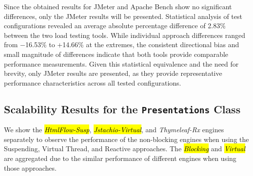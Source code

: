 \documentclass[software,article,accept,pdftex,moreauthors]{Definitions/mdpi}
\begin{document}
Since the obtained results for JMeter and Apache Bench show no significant
differences, only the JMeter results will be presented. Statistical analysis of
test configurations revealed an average absolute percentage difference of
2.83\% between the two load testing tools. While individual approach
differences ranged from $-$16.53\% to +14.66\% at the extremes, the consistent
directional bias and small magnitude of differences indicate that both tools
provide comparable performance measurements. Given this statistical equivalence
and the need for brevity, only JMeter results are presented, as they provide
representative performance characteristics across all tested configurations.

\subsection{Scalability Results for the \texttt{Presentations} Class} \label{sec:presentations-results}


We show the \textit{\hl{HtmlFlow-Susp}}, \textit{\hl{Jstachio-Virtual}}, and
\textit{Thymeleaf-Rx} engines separately to observe the performance of the
non-blocking engines when using the Suspending, Virtual Thread, and Reactive
approaches. The \textit{\hl{Blocking}} and \textit{\hl{Virtual}} are aggregated due to
the similar performance of different engines when using those approaches.
\end{document}
